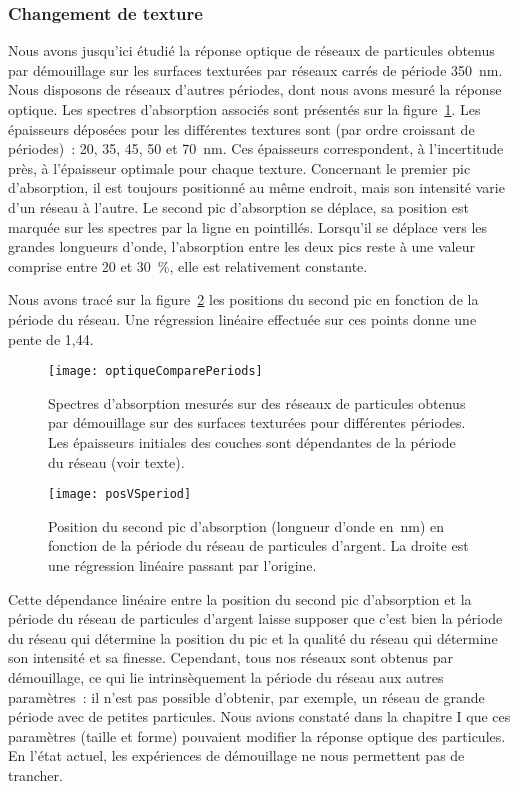 	\subsubsection{Changement de texture}
Nous avons jusqu'ici étudié la réponse optique de réseaux de particules obtenus par démouillage sur les surfaces texturées par réseaux carrés de période 350~nm. Nous disposons de réseaux d'autres périodes, dont nous avons mesuré la réponse optique. Les spectres d'absorption associés sont présentés sur la figure~\ref{optiqueComparePeriods}. Les épaisseurs déposées pour les différentes textures sont (par ordre croissant de périodes)~: 20, 35, 45, 50 et 70~nm. Ces épaisseurs correspondent, à l'incertitude près, à l'épaisseur optimale pour chaque texture. Concernant le premier pic d'absorption, il est toujours positionné au même endroit, mais son intensité varie d'un réseau à l'autre. Le second pic d'absorption se déplace, sa position est marquée sur les spectres par la ligne en pointillés. Lorsqu'il se déplace vers les grandes longueurs d'onde, l'absorption entre les deux pics reste à une valeur comprise entre 20 et 30~\%, elle est relativement constante.\par
Nous avons tracé sur la figure~\ref{posVSperiod} les positions du second pic en fonction de la période du réseau. Une régression linéaire effectuée sur ces points donne une pente de 1,44.\par 
\begin{figure}[!htb]
\centering
\texttt{[image: optiqueComparePeriods]}
\caption{Spectres d’absorption mesurés sur des réseaux de particules obtenus par démouillage sur des surfaces texturées pour différentes périodes. Les épaisseurs initiales des couches sont dépendantes de la période du réseau (voir texte).}
\label{optiqueComparePeriods}
\end{figure}
\begin{figure}[!htb]
\centering
\texttt{[image: posVSperiod]}
\caption{Position du second pic d'absorption (longueur d'onde en~nm) en fonction de la période du réseau de particules d'argent. La droite est une régression linéaire passant par l'origine.}
\label{posVSperiod}
\end{figure}
Cette dépendance linéaire entre la position du second pic d'absorption et la période du réseau de particules d'argent laisse supposer que c'est bien la période du réseau qui détermine la position du pic et la qualité du réseau qui détermine son intensité et sa finesse. Cependant, tous nos réseaux sont obtenus par démouillage, ce qui lie intrinsèquement la période du réseau aux autres paramètres~: il n'est pas possible d'obtenir, par exemple, un réseau de grande période avec de petites particules. Nous avions constaté dans la chapitre I que ces paramètres (taille et forme) pouvaient modifier la réponse optique des particules. En l'état actuel, les expériences de démouillage ne nous permettent pas de trancher.\par 

